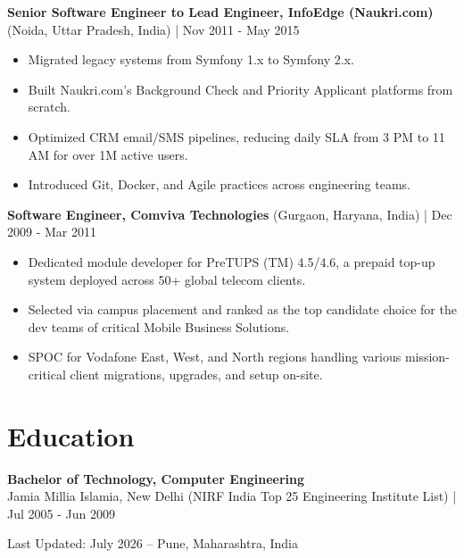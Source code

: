 \documentclass[11pt,a4paper]{article}
\begin{document}
\vspace{4pt}

\textbf{Senior Software Engineer to Lead Engineer, InfoEdge (Naukri.com)} (Noida, Uttar Pradesh, India) | Nov 2011 - May 2015 \\
\begin{itemize}[leftmargin=*]
    \item Migrated legacy systems from Symfony 1.x to Symfony 2.x.
    \item Built Naukri.com's Background Check and Priority Applicant platforms from scratch.
    \item Optimized CRM email/SMS pipelines, reducing daily SLA from 3 PM to 11 AM for over 1M active users.
    \item Introduced Git, Docker, and Agile practices across engineering teams.
\end{itemize}

\vspace{4pt}

\textbf{Software Engineer, Comviva Technologies} (Gurgaon, Haryana, India) | Dec 2009 - Mar 2011 \\
\begin{itemize}[leftmargin=*]
    \item Dedicated module developer for PreTUPS (TM) 4.5/4.6, a prepaid top-up system deployed across 50+ global telecom clients.
    \item Selected via campus placement and ranked as the top candidate choice for the dev teams of critical Mobile Business Solutions.
    \item SPOC for Vodafone East, West, and North regions handling various mission-critical client migrations, upgrades, and setup on-site.
\end{itemize}

\section*{Education}
\textbf{Bachelor of Technology, Computer Engineering} \\
Jamia Millia Islamia, New Delhi (NIRF India Top 25 Engineering Institute List) | Jul 2005 - Jun 2009

\vspace{4pt}
Last Updated: July 2026 -- Pune, Maharashtra, India
\end{document}
